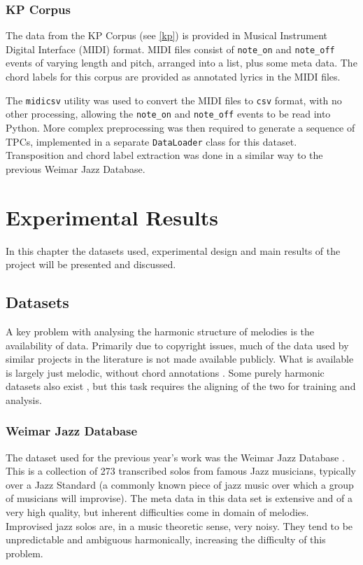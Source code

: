 \documentclass[bsc,singlespacing,logo, parskip, deptreport]{infthesis}
\begin{document}
\subsection{KP Corpus}

The data from the KP Corpus (see \ref{kp}) is provided in Musical Instrument Digital Interface (MIDI) format. MIDI files consist of {\tt note\_on} and {\tt note\_off} events of varying length and pitch, arranged into a list, plus some meta data. The chord labels for this corpus are provided as annotated lyrics in the MIDI files.

The {\tt midicsv} \cite{walker_2008} utility was used to convert the MIDI files to {\tt csv} format, with no other processing, allowing the {\tt note\_on} and {\tt note\_off} events to be read into Python. More complex preprocessing was then required to generate a sequence of TPCs, implemented in a separate {\tt DataLoader} class for this dataset. Transposition and chord label extraction was done in a similar way to the previous Weimar Jazz Database.

\chapter{Experimental Results} \label{Experimental Results}

In this chapter the datasets used, experimental design and main results of the project will be presented and discussed.

\section{Datasets} \label{Datasets}
A key problem with analysing the harmonic structure of melodies is the availability of data. Primarily due to copyright issues, much of the data used by similar projects in the literature is not made available publicly. What is available is largely just melodic, without chord annotations \cite{turetsky2003ground} \cite{MuellerKBA11_SMD_ISMIR-lateBreaking}. Some purely harmonic datasets also exist \cite{burgoyne2011expert} \cite{digiorgi2013automatic}, but this task requires the aligning of the two for training and analysis.

\subsection{Weimar Jazz Database} \label{wjazz}
The dataset used for the previous year's work was the Weimar Jazz Database \cite{wjazz}. This is a collection of 273 transcribed solos from famous Jazz musicians, typically over a Jazz Standard (a commonly known piece of jazz music over which a group of musicians will improvise). The meta data in this data set is extensive and of a very high quality, but inherent difficulties come in domain of melodies. Improvised jazz solos are, in a music theoretic sense, very noisy. They tend to be unpredictable and ambiguous harmonically, increasing the difficulty of this problem.
\end{document}
